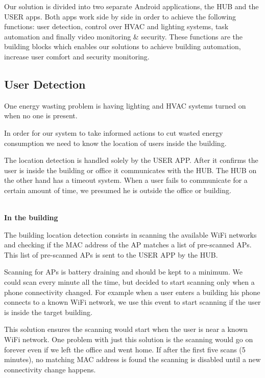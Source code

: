 Our solution is divided into two separate Android applications, the HUB and the USER apps. Both apps work side by side in order to achieve the following functions: user detection, control over \ac{HVAC} and lighting systems, task automation and finally video monitoring \& security. These functions are the building blocks which enables our solutions to achieve building automation, increase user comfort and security monitoring.


\subsection{User Detection}\label{user_detection_imp}

One energy wasting problem is having lighting and \ac{HVAC} systems turned on when no one is present.


In order for our system to take informed actions to cut wasted energy consumption we need to know the location of users inside the building.


The location detection is handled solely by the USER APP. After it confirms the user is inside the building or office it communicates with the HUB. The HUB on the other hand has a timeout system. When a user fails to communicate for a certain amount of time, we presumed he is outside the office or building.

\mbox{}\\
\textbf{In the building}

The building location detection consists in scanning the available \ac{WiFi} networks and checking if the \ac{MAC address} of the \ac{AP} matches a list of pre-scanned \ac{AP}s. This list of pre-scanned \ac{AP}s is sent to the USER APP by the HUB.  

Scanning for \ac{AP}s is battery draining and should be kept to a minimum. We could scan every minute all the time, but decided to start scanning only when a phone connectivity changed. For example when a user enters a building his phone connects to a known \ac{WiFi} network, we use this event to start scanning if the user is inside the target building.


This solution ensures the scanning would start when the user is near a known \ac{WiFi} network. One problem with just this solution is the scanning would go on forever even if we left the office and went home. If after the first five scans (5 minutes), no matching \ac{MAC address} is found the scanning is disabled until a new connectivity change happens. 


